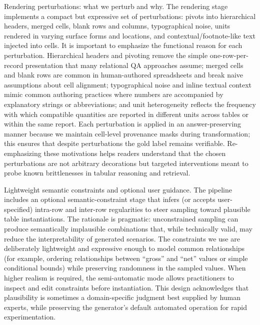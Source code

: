 \documentclass[11pt]{article}
\begin{document}
Rendering perturbations: what we perturb and why. The rendering stage implements a compact but expressive set of perturbations: pivots into hierarchical headers, merged cells, blank rows and columns, typographical noise, units rendered in varying surface forms and locations, and contextual/footnote-like text injected into cells. It is important to emphasize the functional reason for each perturbation. Hierarchical headers and pivoting remove the simple one-row-per-record presentation that many relational QA approaches assume; merged cells and blank rows are common in human-authored spreadsheets and break naive assumptions about cell alignment; typographical noise and inline textual context mimic common authoring practices where numbers are accompanied by explanatory strings or abbreviations; and unit heterogeneity reflects the frequency with which compatible quantities are reported in different units across tables or within the same report. Each perturbation is applied in an answer-preserving manner because we maintain cell-level provenance masks during transformation; this ensures that despite perturbations the gold label remains verifiable. Re-emphasizing these motivations helps readers understand that the chosen perturbations are not arbitrary decorations but targeted interventions meant to probe known brittlenesses in tabular reasoning and retrieval.

Lightweight semantic constraints and optional user guidance. The pipeline includes an optional semantic-constraint stage that infers (or accepts user-specified) intra-row and inter-row regularities to steer sampling toward plausible table instantiations. The rationale is pragmatic: unconstrained sampling can produce semantically implausible combinations that, while technically valid, may reduce the interpretability of generated scenarios. The constraints we use are deliberately lightweight and expressive enough to model common relationships (for example, ordering relationships between ``gross'' and ``net'' values or simple conditional bounds) while preserving randomness in the sampled values. When higher realism is required, the semi-automatic mode allows practitioners to inspect and edit constraints before instantiation. This design acknowledges that plausibility is sometimes a domain-specific judgment best supplied by human experts, while preserving the generator's default automated operation for rapid experimentation.
\end{document}

